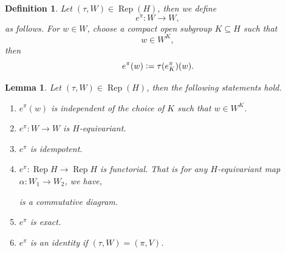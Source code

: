 \documentclass[8pt]{article}
\newtheorem{definition}{Definition}[section]
\newtheorem{lemma}{Lemma}[section]
\DeclareMathOperator{\Rep}{Rep}
\newcommand{\defeq}{\vcentcolon=}
\begin{document}
\begin{definition}
  Let $(\tau,W)\in\Rep(H)$, then we define 
  \begin{equation*}
    e^\pi:W\to W,
  \end{equation*}
  as follows. For $w\in W$, choose a compact open subgroup $K\subseteq H$ such that 
  \begin{equation*}
    w\in W^K,
  \end{equation*}
  then 
  \begin{equation*}
    e^\pi(w) \defeq \tau(e_K^\pi)(w).
  \end{equation*}
\end{definition}

\begin{lemma}
  Let $(\tau,W)\in\Rep(H)$, then the following statements hold.
  \begin{enumerate}[1).]
    \item $e^\pi(w)$ is independent of the choice of $K$ such that $w\in W^K$.
    \item $e^\pi:W\to W$ is $H$-equivariant.
    \item $e^\pi$ is idempotent.
    \item $e^\pi:\Rep H\to\Rep H$ is functorial. That is for any $H$-equivariant map $\alpha:W_1\to W_2$, we have,
    \begin{center}
    \end{center}
    is a commutative diagram.
    \item $e^\pi$ is exact.
    \item $e^\pi$ is an identity if $(\tau,W) = (\pi,V)$.
  \end{enumerate}
\end{lemma}
\end{document}

